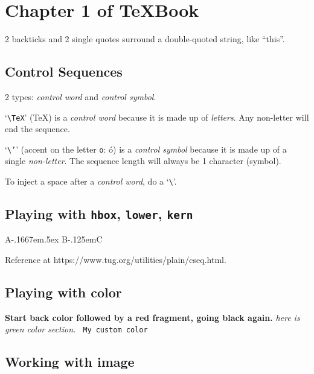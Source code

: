 \documentclass[a4paper, oneside, 12pt, parskip=half]{scrbook}
\begin{document}
\tableofcontents

\chapter{Chapter 1 of TeXBook}

2 backticks and 2 single quotes surround a double-quoted string, like ``this''.

\section{Control Sequences}

2 types: \textit{control word} and \textit{control symbol}.

`\texttt{\textbackslash TeX}' (\TeX) is a \textit{control word} because it is made up of \textit{letters}. Any non-letter will end the sequence.

`\texttt{\textbackslash '}' (accent on the letter \texttt{o}: \'o) is a \textit{control symbol} because it is made up of a single \textit{non-letter}. The sequence length will always be 1 character (symbol).

To inject a space after a \textit{control word}, do a `\texttt{\textbackslash \textvisiblespace}'.

\section{Playing with \texttt{hbox}, \texttt{lower}, \texttt{kern}}

A\kern -.1667em\lower .5ex \hbox {B}\kern -.125emC

Reference at https://www.tug.org/utilities/plain/cseq.html.

\section{Playing with color}

\textbf{Start back color {\color{red}followed by a red fragment}, going black again.} \textit{{\color{green} here is green color section.}} \texttt{\color{mycolor} My custom color}

\section{Working with image}
\end{document}
